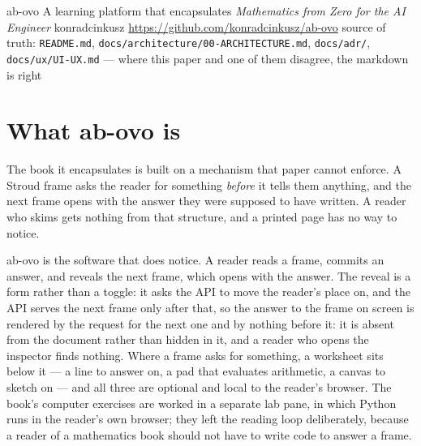\documentclass[11pt,a4paper]{article}
\begin{document}
\housetitle
    {ab-ovo}
    {A learning platform that encapsulates \emph{Mathematics from Zero for the AI Engineer}}
    {konradcinkusz}
    {\url{https://github.com/konradcinkusz/ab-ovo}}
    {source of truth: \texttt{README.md}, \texttt{docs/architecture/00-ARCHITECTURE.md},
     \texttt{docs/adr/}, \texttt{docs/ux/UI-UX.md} --- where this paper and one of them
     disagree, the markdown is right}

\begin{abstract}
\noindent
ab-ovo is a learning platform built around a book of 47 programmed-learning programs, in
English and Polish, together with that book's computer exercises. This document is a
project overview: what the system is, what it deliberately is not, what exists in the
repository today, and what is planned. It is not a research paper and reports no result.
Every statement in it is drawn from the repository's markdown documentation, which is the
source of truth; where the two disagree, the markdown is right. Its figures are the
repository's own diagrams, rendered from the same sources GitHub renders.
\end{abstract}

\section{What ab-ovo is}

The book it encapsulates is built on a mechanism that paper cannot enforce. A Stroud frame
asks the reader for something \emph{before} it tells them anything, and the next frame opens
with the answer they were supposed to have written. A reader who skims gets nothing from
that structure, and a printed page has no way to notice.

ab-ovo is the software that does notice. A reader reads a frame, commits an answer, and
reveals the next frame, which opens with the answer. The reveal is a form rather than a
toggle: it asks the API to move the reader's place on, and the API serves the next frame only
after that, so the answer to the frame on screen is rendered by the request for the next one
and by nothing before it: it is absent from the document rather than hidden in it, and a
reader who opens the inspector finds nothing. Where a frame asks for something, a worksheet
sits below it --- a line to answer on, a pad that evaluates arithmetic, a canvas to sketch
on --- and all three are optional and local to the reader's browser. The book's computer
exercises are worked in a separate lab pane, in which Python runs in the reader's own
browser; they left the reading loop deliberately, because a reader of a mathematics book
should not have to write code to answer a frame.
\end{document}
